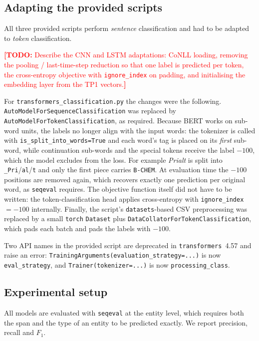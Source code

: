 \documentclass[11pt,a4paper]{article}
\newcommand{\TODO}[1]{\textcolor{red}{\textbf{[TODO:} #1\textbf{]}}}
\begin{document}
\subsection{Adapting the provided scripts}
\label{sec:adaptation}

All three provided scripts perform \emph{sentence} classification and had to be adapted to
\emph{token} classification.

\TODO{Describe the CNN and LSTM adaptations: CoNLL loading, removing the pooling / last-time-step
reduction so that one label is predicted per token, the cross-entropy objective with
\texttt{ignore\_index} on padding, and initialising the embedding layer from the TP1 vectors.}

For \texttt{transformers\_classification.py} the changes were the following.
\texttt{AutoModelForSequenceClassification} was replaced by
\texttt{AutoModelForTokenClassification}, as required. Because BERT works on sub-word units,
the labels no longer align with the input words: the tokenizer is called with
\texttt{is\_split\_into\_words=True} and each word's tag is placed on its \emph{first}
sub-word, while continuation sub-words and the special tokens receive the label $-100$, which
the model excludes from the loss. For example \emph{Prialt} is split into
\texttt{\_Pri}/\texttt{al}/\texttt{t} and only the first piece carries \texttt{B-CHEM}. At
evaluation time the $-100$ positions are removed again, which recovers exactly one prediction
per original word, as \texttt{seqeval} requires. The objective function itself did not have to
be written: the token-classification head applies cross-entropy with
\texttt{ignore\_index}$=-100$ internally. Finally, the script's \texttt{datasets}-based CSV
preprocessing was replaced by a small \texttt{torch} \texttt{Dataset} plus
\texttt{DataCollatorForTokenClassification}, which pads each batch and pads the labels with
$-100$.

Two API names in the provided script are deprecated in \texttt{transformers}~4.57 and raise an
error: \texttt{TrainingArguments(evaluation\_strategy=...)} is now \texttt{eval\_strategy}, and
\texttt{Trainer(tokenizer=...)} is now \texttt{processing\_class}.

\subsection{Experimental setup}
\label{sec:ner-setup}

All models are evaluated with \texttt{seqeval} at the entity level, which requires both the
span and the type of an entity to be predicted exactly. We report precision, recall and $F_1$.
\end{document}
